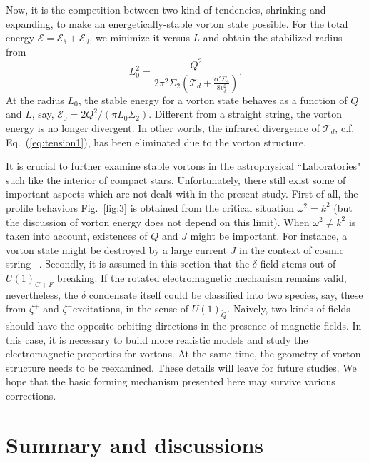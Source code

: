 \documentclass[prd, showpacs,nofootinbib,amsmath,amssymb]{revtex4}
\begin{document}
Now, it is the competition between two kind of tendencies, shrinking and expanding, to make an energetically-stable vorton state possible. For the total energy $\mathcal{E} = \mathcal{E}_\delta + \mathcal{E}_d$, we minimize it versus $L$ and obtain the stabilized radius from  
\begin{equation}
\label{eq:vortonr}
 L_0^2 = \frac{Q^2}{2\pi^2\Sigma_2(\mathcal{T}_d +
   \frac{\alpha' \Sigma_4}{8v_\delta^2})}.
\end{equation}
At the radius $L_0$, the stable energy for a vorton state behaves as a
function of $Q$ and $L$, say, $\mathcal{E}_0 = 2 Q^2/(\pi L_0 \Sigma_2)$.
Different from a straight string, the vorton energy is no longer divergent. In other words, the infrared divergence of $\mathcal{T}_d$, c.f. Eq.~(\ref{eq:tension1}), has been eliminated due to the vorton structure.

It is crucial to further examine stable vortons in the astrophysical ``Laboratories" such like the interior of compact stars.
Unfortunately, there still exist some of important aspects which are not dealt with in the present study. 
First of all, the profile behaviors Fig.~\ref{fig:3} is obtained from the critical situation $\omega^2 = k^2$ (but the discussion of vorton energy does not depend on this limit). When $\omega^2 \neq k^2$ is taken into account, existences of $Q$ and $J$ might be important. For instance, a vorton state might be destroyed by a large current $J$ in the context of cosmic string ~\cite{vilenkin2000cosmic}.
Secondly, it is assumed in this section that the $\delta$ field stems out of $U(1)_{C+F}$ breaking.
If the rotated electromagnetic mechanism remains valid, nevertheless, the $\delta$ condensate itself could be classified into two species, say, these from $\zeta^+$ and $\zeta^-$excitations, in the sense of $U(1)_{\widetilde{Q}}$. 
Naively, two kinds of fields should have the opposite orbiting directions in the presence of magnetic fields.
In this case, it is necessary to build more realistic models and study the electromagnetic properties for vortons. 
At the same time, the geometry of vorton structure needs to be reexamined. These details will leave for future studies. We hope that the basic forming mechanism presented here may survive various corrections.

\section{Summary and discussions}
\label{sec:4}
\end{document}
